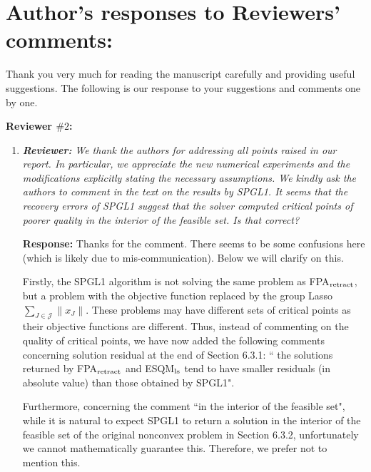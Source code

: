\documentclass{article}
\begin{document}
\section*{Author's responses to Reviewers' comments:}
Thank you very much for reading the manuscript carefully and providing useful suggestions. The following is our response to your suggestions and comments one by one.

\textbf{Reviewer $\# 2$:}
\begin{enumerate}
        \item \textit{\textbf{Reviewer:}} \textit{ We thank the authors for addressing all points raised in our report. In particular, we appreciate the new numerical experiments and the modifications explicitly stating the necessary assumptions. We kindly ask the authors to comment in the text on the results by SPGL1. It seems that the recovery errors of SPGL1 suggest that the solver computed critical points of poorer quality in the interior of the feasible set. Is that correct?}

        \textbf{Response:} Thanks for the comment. There seems to be some confusions here (which is likely due to mis-communication). Below we will clarify on this.

Firstly, the SPGL1 algorithm is not solving the same problem as FPA$_{\rm retract}$, but a problem with the objective function replaced by the group Lasso $\sum\limits_{J\in\mathcal{J}}\|x_J\|$. These problems may have different sets of critical points as their objective functions are different. Thus, instead of commenting on the quality of critical points, we have now added the following comments concerning solution residual at the end of Section 6.3.1: `` the solutions returned by FPA$_{\rm retract}$ and
{\rm ESQM}$_{\rm ls}$ tend to have smaller residuals (in absolute value) than those obtained by SPGL1".

Furthermore, concerning the comment ``in the interior of the feasible set", while
it is natural to expect SPGL1 to return a solution in the interior of the feasible set of the original nonconvex problem in Section 6.3.2, unfortunately we cannot mathematically guarantee this. %
Therefore, we prefer
not to mention this.


\end{enumerate}
\end{document}
